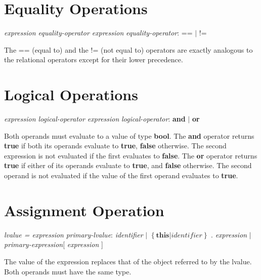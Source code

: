 \begin{homeworkProblem}
    \section{Equality Operations}
    \textit{expression equality-operator expression}
    \newline
    \textit{equality-operator}: == $|$ != 

    The == (equal to) and the != (not equal to) operators are exactly analogous to the relational operators except for their lower precedence.

    \section{Logical Operations}
\textit{expression logical-operator expression}
    \newline
    \textit{logical-operator}: \textbf{and} $|$ \textbf{or}

    Both operands must evaluate to a value of type \textbf{bool}. The \textbf{and} operator returns \textbf{true} if both its operands evaluate to \textbf{true}, \textbf{false} otherwise. The second expression is not evaluated if the first evaluates to \textbf{false}. The \textbf{or} operator returns \textbf{true} if either of its operands evaluate to \textbf{true}, and \textbf{false} otherwise. The second operand is not evaluated if the value of the first operand evaluates to \textbf{true}.

    \section{Assignment Operation}
    \textit{lvalue = expression}
    \newline
    \textit{primary-lvalue}: \textit{identifier} $|$ $\left\{\textbf{this} | \textit{identifier} \right\}$ . \textit{expression} $|$ \textit{primary-expression}[ \textit{expression} ]

    The value of the expression replaces that of the object referred to by the lvalue. Both operands must have the same type.
    \end{homeworkProblem}
